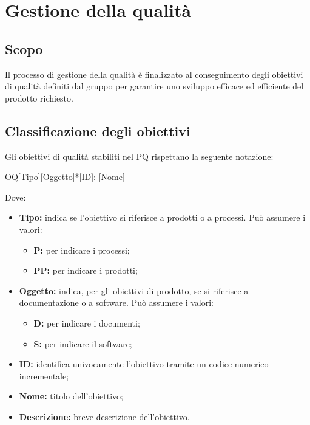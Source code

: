 \documentclass[../NormediProgetto.tex]{subfiles}
\begin{document}

\section{Gestione della qualità}

\subsection{Scopo}
Il processo di gestione della qualità è finalizzato al conseguimento degli obiettivi di qualità definiti dal gruppo per garantire uno sviluppo efficace ed efficiente del prodotto richiesto.

\subsection{Classificazione degli obiettivi}

Gli obiettivi di qualità stabiliti nel PQ rispettano la seguente notazione:

    \begin{center}
        OQ[Tipo][Oggetto]*[ID]: [Nome]
    \end{center}
    
Dove:

\begin{itemize}
    \item \textbf{Tipo:} indica se l'obiettivo si riferisce a prodotti o a processi. Può assumere i valori:
    
    \begin{itemize}
        \item \textbf{P:} per indicare i processi;
        \item \textbf{PP:} per indicare i prodotti;
    \end{itemize}
    
    \item \textbf{Oggetto:} indica, per gli obiettivi di prodotto, se si riferisce a documentazione o a software. Può assumere i valori:
    
    \begin{itemize}
        \item \textbf{D:} per indicare i documenti;
        \item \textbf{S:} per indicare il software;
    \end{itemize}
    
    \item \textbf{ID:} identifica univocamente l'obiettivo tramite un codice numerico incrementale;
    
    \item \textbf{Nome:} titolo dell'obiettivo;
    
    \item \textbf{Descrizione:} breve descrizione dell'obiettivo.
\end{itemize}
\end{document}
